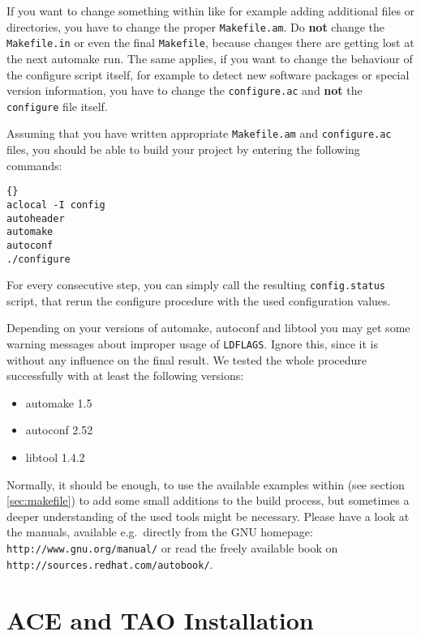 If you want to change something within \miro like for example adding
additional files or directories, you have to change the proper
\texttt{Makefile.am}. Do \textbf{not} change the \texttt{Makefile.in}
or even the final \texttt{Makefile}, because changes there are getting
lost at the next automake run. The same applies, if you want to
change the behaviour of the configure script itself, for example to
detect new software packages or special version information, you have
to change the \texttt{configure.ac} and \textbf{not} the
\texttt{configure} file itself.

Assuming that you have written appropriate \texttt{Makefile.am} and
\texttt{configure.ac} files, you should be able to build your project
by entering the following commands:

\begin{lstlisting}[frame=tb]{}
aclocal -I config
autoheader
automake
autoconf
./configure
\end{lstlisting}

For every consecutive step, you can simply call the resulting
\texttt{config.status} script, that rerun the configure procedure with
the used configuration values.

Depending on your versions of automake, autoconf and libtool you may
get some warning messages about improper usage of \texttt{LDFLAGS}.
Ignore this, since it is without any influence on the final result. We
tested the whole procedure successfully with at least the following
versions:
\begin{itemize}
\item automake 1.5
\item autoconf 2.52
\item libtool 1.4.2
\end{itemize}

Normally, it should be enough, to use the available examples within
\miro (see section \ref{sec:makefile}) to add some small additions to
the build process, but sometimes a deeper understanding of the used
tools might be necessary. Please have a look at the manuals, available
e.g.\ directly from the GNU homepage:
\texttt{http://www.gnu.org/manual/} or read the freely available book
on \texttt{http://sources.redhat.com/autobook/}.

\chapter{ACE and TAO Installation}
\label{sec::aceInstall}

